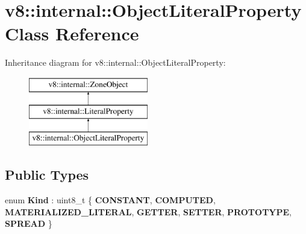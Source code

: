 \hypertarget{classv8_1_1internal_1_1ObjectLiteralProperty}{}\section{v8\+:\+:internal\+:\+:Object\+Literal\+Property Class Reference}
\label{classv8_1_1internal_1_1ObjectLiteralProperty}
Inheritance diagram for v8\+:\+:internal\+:\+:Object\+Literal\+Property\+:\begin{figure}[H]
\begin{center}
\leavevmode
\includegraphics[height=3.000000cm]{classv8_1_1internal_1_1ObjectLiteralProperty}
\end{center}
\end{figure}
\subsection*{Public Types}
\begin{DoxyCompactItemize}
\item 
\mbox{\label{classv8_1_1internal_1_1ObjectLiteralProperty_a89ffd5691e212f4a2ce1c8613359e905}} 
enum {\bfseries Kind} \+: uint8\+\_\+t \{ \newline
{\bfseries C\+O\+N\+S\+T\+A\+NT}, 
{\bfseries C\+O\+M\+P\+U\+T\+ED}, 
{\bfseries M\+A\+T\+E\+R\+I\+A\+L\+I\+Z\+E\+D\+\_\+\+L\+I\+T\+E\+R\+AL}, 
{\bfseries G\+E\+T\+T\+ER}, 
\newline
{\bfseries S\+E\+T\+T\+ER}, 
{\bfseries P\+R\+O\+T\+O\+T\+Y\+PE}, 
{\bfseries S\+P\+R\+E\+AD}
 \}
\end{DoxyCompactItemize}
